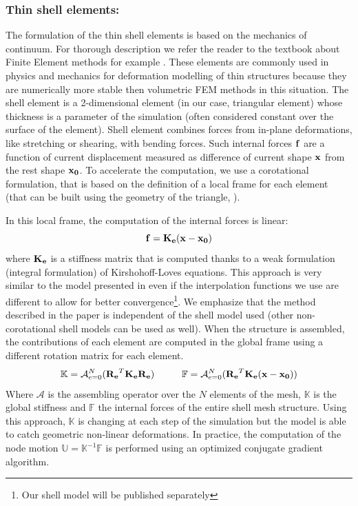 \subsubsection{Thin shell elements: } 
The formulation of the thin shell elements is based on the mechanics of continuum. 
For thorough description we refer the reader to the textbook about Finite Element methods for example \cite{Reddy1993}.
These elements are commonly used in physics and mechanics for deformation modelling of thin structures because they are numerically more stable then volumetric FEM methods in this situation. 
The shell element is a 2-dimensional element (in our case, triangular element) whose thickness is a parameter of the simulation (often considered constant over the surface of the element).
Shell element combines forces from in-plane deformations, like stretching or shearing, with bending forces. 
Such internal forces $\mathbf{f}$ are a function of current displacement measured as difference of current shape
$\mathbf{x}$ from the rest shape $\mathbf{x_0}$.
To accelerate the computation, we use a corotational formulation, that is based on the definition of a local frame for each element (that can be built using the geometry of the triangle, ). 

In this local frame, the computation of the internal forces is linear:
\begin{equation}
  \mathbf{f} = \mathbf{K_e}(\mathbf{x} - \mathbf{x_0})
 \label{linear_static_model} 
\end{equation}
where $\mathbf{K_e}$ is a stiffness matrix that is computed thanks to a weak formulation (integral formulation) of Kirshohoff-Loves equations.
This approach is very similar to the model presented in  \cite{Comas2010b,Comas2010c}  even if the interpolation functions we use are  different to allow for better convergence\footnote{Our shell model will be published separately}. 
We emphasize that the method described in the paper is independent of the shell model used (other non-corotational shell models can be used as well).
%
When the structure is assembled, the contributions of each element are computed in the global frame using a different rotation matrix for each element.
\begin{equation}
\mathbb{K} = \mathcal{A}_{e=0}^N (\mathbf{R_e}^T \mathbf{K_e} \mathbf{R_e}) \hspace{10mm}
\mathbb{F} = \mathcal{A}_{e=0}^N ( \mathbf{R_e}^T \mathbf{K_e}(\myvec{x} - \myvec{x_0}))
\end{equation}
Where $\mathcal{A}$ is the assembling operator over the $N$ elements of the mesh, $\mathbb{K}$ is the global stiffness and $\mathbb{F}$ the internal forces of the entire shell mesh structure. 
Using this approach, $\mathbb{K}$ is changing at each step of the simulation but the model is able to catch geometric non-linear deformations.
In practice, the computation of the node motion $\mathbb{U} = \mathbb{K}^{-1} \mathbb{F}$ is performed using an optimized conjugate gradient algorithm.


